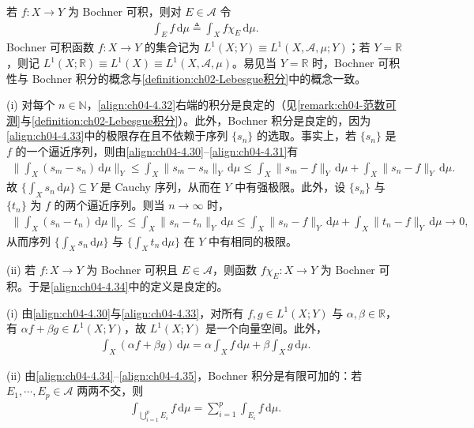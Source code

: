 \documentclass[../../main.tex]{subfiles}%
\begin{document}
若 $f:X\to Y$ 为 Bochner 可积，则对 $E\in\mathcal{A}$ 令
\begin{align}
\int_E f\,\mathrm{d}\mu\triangleq \int_X f\chi_E\,\mathrm{d}\mu. \label{align:ch04-4.34}
\end{align}
Bochner 可积函数 $f:X\to Y$ 的集合记为 $L^1(X;Y)\equiv L^1(X,\mathcal{A},\mu;Y)$；若 $Y=\mathbb{R}$，则记 $L^1(X;\mathbb{R})\equiv L^1(X)\equiv L^1(X,\mathcal{A},\mu)$。易见当 $Y=\mathbb{R}$ 时，Bochner 可积性与 Bochner 积分的概念与\cref{definition:ch02-Lebesgue积分}中的概念一致。

\begin{remark}\label{remark:ch04-Bochner良定义}
(i) 对每个 $n\in\mathbb{N}$，\eqref{align:ch04-4.32}右端的积分是良定的（见\cref{remark:ch04-范数可测}与\cref{definition:ch02-Lebesgue积分}）。此外，Bochner 积分是良定的，因为\eqref{align:ch04-4.33}中的极限存在且不依赖于序列 $\{s_n\}$ 的选取。事实上，若 $\{s_n\}$ 是 $f$ 的一个逼近序列，则由\eqref{align:ch04-4.30}--\eqref{align:ch04-4.31}有
\begin{align*}
\Big\|\int_X(s_m-s_n)\,\mathrm{d}\mu\Big\|_Y\leqslant\int_X\|s_m-s_n\|_Y\,\mathrm{d}\mu\leqslant\int_X\|s_m-f\|_Y\,\mathrm{d}\mu+\int_X\|s_n-f\|_Y\,\mathrm{d}\mu.
\end{align*}
故 $\{\int_X s_n\,\mathrm{d}\mu\}\subseteq Y$ 是 Cauchy 序列，从而在 $Y$ 中有强极限。此外，设 $\{s_n\}$ 与 $\{t_n\}$ 为 $f$ 的两个逼近序列。则当 $n\to\infty$ 时，
\begin{align*}
\Big\|\int_X(s_n-t_n)\,\mathrm{d}\mu\Big\|_Y\leqslant\int_X\|s_n-t_n\|_Y\,\mathrm{d}\mu\leqslant\int_X\|s_n-f\|_Y\,\mathrm{d}\mu+\int_X\|t_n-f\|_Y\,\mathrm{d}\mu\to0,
\end{align*}
从而序列 $\{\int_X s_n\,\mathrm{d}\mu\}$ 与 $\{\int_X t_n\,\mathrm{d}\mu\}$ 在 $Y$ 中有相同的极限。

(ii) 若 $f:X\to Y$ 为 Bochner 可积且 $E\in\mathcal{A}$，则函数 $f\chi_E:X\to Y$ 为 Bochner 可积。于是\eqref{align:ch04-4.34}中的定义是良定的。
\end{remark}

\begin{remark}\label{remark:ch04-积分线性}
(i) 由\eqref{align:ch04-4.30}与\eqref{align:ch04-4.33}，对所有 $f,g\in L^1(X;Y)$ 与 $\alpha,\beta\in\mathbb{R}$，有 $\alpha f+\beta g\in L^1(X;Y)$，故 $L^1(X;Y)$ 是一个向量空间。此外，
\begin{align}
\int_X(\alpha f+\beta g)\,\mathrm{d}\mu=\alpha\int_X f\,\mathrm{d}\mu+\beta\int_X g\,\mathrm{d}\mu. \label{align:ch04-4.35}
\end{align}

(ii) 由\eqref{align:ch04-4.34}--\eqref{align:ch04-4.35}，Bochner 积分是有限可加的：若 $E_1,\cdots ,E_p\in\mathcal{A}$ 两两不交，则
\begin{align}
\int_{\bigcup_{i=1}^p E_i}f\,\mathrm{d}\mu=\sum_{i=1}^p\int_{E_i}f\,\mathrm{d}\mu. \label{align:ch04-4.36}
\end{align}
\end{remark}
\end{document}
